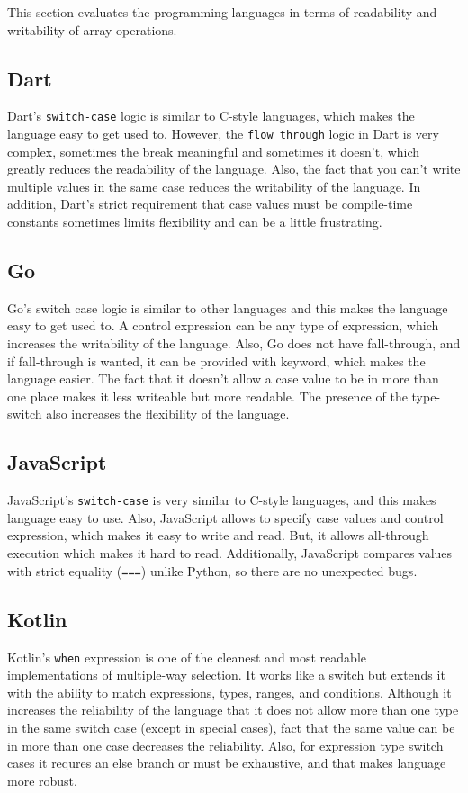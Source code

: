 \documentclass{article}
\begin{document}
This section evaluates the programming languages in terms of readability and writability of array operations.

\subsection{Dart}
Dart's \texttt{switch-case} logic is similar to C-style languages, which makes the language easy to get used to. However, the \texttt{flow through} logic in Dart is very complex, sometimes the break meaningful and sometimes it doesn't, which greatly reduces the readability of the language. Also, the fact that you can't write multiple values in the same case reduces the writability of the language. In addition, Dart’s strict requirement that case values must be compile-time constants sometimes limits flexibility and can be a little frustrating. 

\subsection{Go}
Go's switch case logic is similar to other languages and this makes the language easy to get used to. A control expression can be any type of expression, which increases the writability of the language. Also, Go does not have fall-through, and if fall-through is wanted, it can be provided with keyword, which makes the language easier. The fact that it doesn't allow a case value to be in more than one place makes it less writeable but more readable. The presence of the type-switch also increases the flexibility of the language.

\subsection{JavaScript}
JavaScript’s \texttt{switch-case} is very similar to C-style languages, and this makes language easy to use. Also, JavaScript allows to specify case values and control expression, which makes it easy to write and read. But, it allows all-through execution which makes it hard to read. Additionally, JavaScript compares values with strict equality (\texttt{===}) unlike Python, so there are no unexpected bugs.


\subsection{Kotlin}
Kotlin’s \texttt{when} expression is one of the cleanest and most readable implementations of multiple-way selection. It works like a switch but extends it with the ability to match expressions, types, ranges, and conditions. Although it increases the reliability of the language that it does not allow more than one type in the same switch case (except in special cases), fact that the same value can be in more than one case decreases the reliability. Also, for expression type switch cases it requres an else branch or must be exhaustive, and that makes language more robust.
\end{document}
